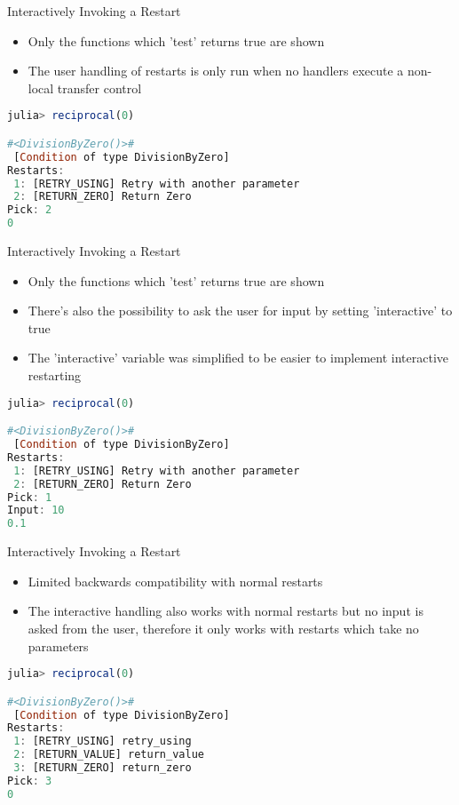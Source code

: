 \documentclass{beamer}
\begin{document}
\begin{frame}[fragile,t]{Interactively Invoking a Restart}

\begin{itemize}
    \item Only the functions which 'test' returns true are shown
    \item The user handling of restarts is only run when no handlers execute a non-local transfer control
\end{itemize}
\vfill

\begin{lstlisting}[language=julia, style=jlcodestyle,]
julia> reciprocal(0)

#<DivisionByZero()>#
 [Condition of type DivisionByZero]
Restarts:
 1: [RETRY_USING] Retry with another parameter
 2: [RETURN_ZERO] Return Zero
Pick: 2
0
\end{lstlisting}
\end{frame}
\begin{frame}[fragile,t]{Interactively Invoking a Restart}

\begin{itemize}
    \item Only the functions which 'test' returns true are shown
    \item There's also the possibility to ask the user for input by setting 'interactive' to true
    \item The 'interactive' variable was simplified to be easier to implement interactive restarting
\end{itemize}
\vfill

\begin{lstlisting}[language=julia, style=jlcodestyle,]
julia> reciprocal(0)

#<DivisionByZero()>#
 [Condition of type DivisionByZero]
Restarts:
 1: [RETRY_USING] Retry with another parameter
 2: [RETURN_ZERO] Return Zero
Pick: 1
Input: 10
0.1
\end{lstlisting}
\end{frame}

\begin{frame}[fragile,t]{Interactively Invoking a Restart}

\begin{itemize}
    \item Limited backwards compatibility with normal restarts
    \item The interactive handling also works with normal restarts but no input is asked from the user, therefore it only works with restarts which take no parameters
\end{itemize}
\vfill

\begin{lstlisting}[language=julia, style=jlcodestyle,]
julia> reciprocal(0)

#<DivisionByZero()>#
 [Condition of type DivisionByZero]
Restarts:
 1: [RETRY_USING] retry_using
 2: [RETURN_VALUE] return_value
 3: [RETURN_ZERO] return_zero
Pick: 3
0
\end{lstlisting}
\end{frame}
\end{document}
